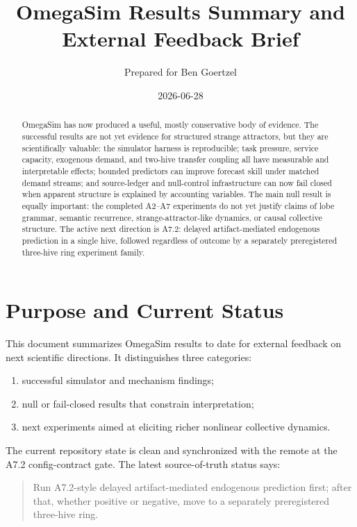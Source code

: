 \documentclass[11pt]{article}
\title{OmegaSim Results Summary and External Feedback Brief}
\author{Prepared for Ben Goertzel}
\date{2026-06-28}
\begin{document}
\maketitle

\begin{abstract}
OmegaSim has now produced a useful, mostly conservative body of evidence.
The successful results are not yet evidence for structured strange attractors,
but they are scientifically valuable: the simulator harness is reproducible;
task pressure, service capacity, exogenous demand, and two-hive transfer
coupling all have measurable and interpretable effects; bounded predictors
can improve forecast skill under matched demand streams; and source-ledger
and null-control infrastructure can now fail closed when apparent structure is
explained by accounting variables. The main null result is equally important:
the completed A2--A7 experiments do not yet justify claims of lobe grammar,
semantic recurrence, strange-attractor-like dynamics, or causal collective
structure. The active next direction is A7.2: delayed artifact-mediated
endogenous prediction in a single hive, followed regardless of outcome by a
separately preregistered three-hive ring experiment family.
\end{abstract}

\section{Purpose and Current Status}

This document summarizes OmegaSim results to date for external feedback on
next scientific directions. It distinguishes three categories:

\begin{enumerate}
\item successful simulator and mechanism findings;
\item null or fail-closed results that constrain interpretation;
\item next experiments aimed at eliciting richer nonlinear collective
dynamics.
\end{enumerate}

The current repository state is clean and synchronized with the remote at the
A7.2 config-contract gate. The latest source-of-truth status says:

\begin{quote}
Run A7.2-style delayed artifact-mediated endogenous prediction first; after
that, whether positive or negative, move to a separately preregistered
three-hive ring.
\end{quote}
\end{document}
